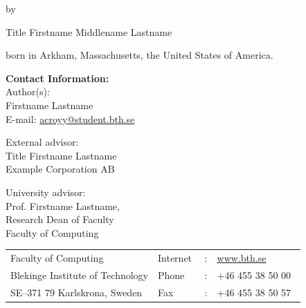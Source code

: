 {\begin{center}
		\par\vspace{1cm}
		\begin{large}
			by
		\end{large}

		\par\vspace{1cm}
		\begin{Large}
			Title Firstname Middlename Lastname
		\end{Large}

		\par\vspace{0.5cm}
		\begin{large}
			born in Arkham, Massachusetts, the United States of America.
		\end{large}
	\end{center}

	\clearpage

	\textbf{Contact Information:}\\
	Author(s):\\
	Firstname Lastname \\
	E-mail: \href{mailto:acroyy@student.bth.se}{acroyy@student.bth.se}

	\bigskip

	External advisor: \\
	Title Firstname Lastname\\
	Example Corporation AB

	\bigskip

	University advisor:\\
	Prof. Firstname Lastname,\\
	Research Dean of Faculty\\ %
	Faculty of Computing

	\vfill

	\begin{tabular}{p{0.5\linewidth}lcl}
		Faculty of Computing				& Internet	& : & \href{http://www.bth.se}{www.bth.se}\\
		Blekinge Institute of Technology	& Phone		& : & +46 455 38 50 00\\
		SE--371 79 Karlskrona, Sweden		& Fax		& : & +46 455 38 50 57\\
	\end{tabular}

	\bigskip \bigskip %

	\clearpage
}
